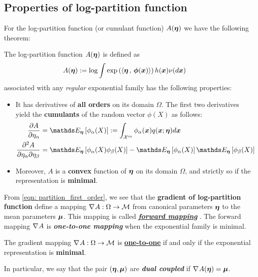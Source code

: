 \documentclass[11pt]{article}
\begin{document}
\subsection{Properties of log-partition function}
For the log-partition function (or cumulant function) $A(\boldsymbol{\eta})$ we have the following theorem:
\begin{theorem}
The log-partition function $A(\boldsymbol{\eta})$ is defined as
\begin{align}
A(\boldsymbol{\eta}) &:= \log \int \exp\left( \left\langle \boldsymbol{\eta}\,,\, \boldsymbol{\phi}(\boldsymbol{x}) \right\rangle \right)h(\boldsymbol{x})\nu(d\boldsymbol{x}) \label{eqn: log_partition}
\end{align} associated with any \emph{regular} exponential family has the following properties:
\begin{itemize}
\item It has derivatives of \textbf{all orders} on its domain $\Omega$. The first two derivatives yield the \textbf{cumulants} of the random vector $\phi(X)$ as follows:
\begin{align}
\partdiff{A}{\eta_{\alpha}} &= \E{\mb{\eta}}{\phi_{\alpha}(X)} := \int_{\cX^{m}}\phi_{\alpha}(\mb{x}) q(\mb{x}; \mb{\eta}) d\mb{x} \label{eqn: partition_first_order}\\
\frac{\partial^2 A}{ \partial \eta_{\alpha} \partial \eta_{\beta}} &=\E{\mb{\eta}}{\phi_{\alpha}(X)\phi_{\beta}(X)} -  \E{\mb{\eta}}{\phi_{\alpha}(X)} \E{\mb{\eta}}{\phi_{\beta}(X)} \label{eqn: partition_second_order}
\end{align}

\item Moreover, $A$ is a \textbf{convex} function of $\boldsymbol{\eta}$ on its domain $\Omega$, and strictly so if the representation is \textbf{minimal}.
\end{itemize}
\end{theorem}

From \eqref{eqn: partition_first_order}, we see that the \textbf{gradient of log-partition function} define a mapping  $\nabla_{}{A}: \Omega \rightarrow {\mathcal M}$ from canonical parameters $\boldsymbol{\eta}$ to the mean parameters $\boldsymbol{\mu}$. This mapping is called \underline{\textbf{\emph{forward mapping}}} \citep{wainwright2008graphical}. The forward mapping $\nabla_{}{A}$ is \emph{\textbf{one-to-one mapping}} when the exponential family is minimal.
\begin{proposition} The gradient mapping $\nabla_{}{A}: \Omega \rightarrow {\mathcal M}$ is \underline{\textbf{one-to-one}} if and only if the exponential representation is \textbf{minimal}.
\end{proposition}
In particular, we say that the pair $(\boldsymbol{\eta}, \boldsymbol{\mu})$ are \textbf{\emph{dual coupled}} if $\nabla_{}{A(\boldsymbol{\eta})} = \boldsymbol{\mu}$.
\end{document}
